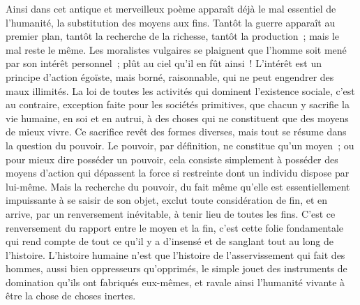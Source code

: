 \documentclass[french,twoside]{book} %
\begin{document}
Ainsi dans cet antique et merveilleux poème apparaît déjà le mal essentiel de l'humanité, la substitution des moyens aux fins. Tantôt la guerre apparaît au premier plan, tantôt la recherche de la richesse, tantôt la production ; mais le mal reste le même. Les moralistes vulgaires se plaignent que l'homme soit mené par son intérêt personnel ; plût au ciel qu'il en fût ainsi ! L'intérêt est un principe d'action égoïste, mais borné, raisonnable, qui ne peut engendrer des maux illimités. La loi de toutes les activités qui dominent l'existence sociale, c'est au contraire, exception faite pour les sociétés primitives, que chacun y sacrifie la vie humaine, en soi et en autrui, à des choses qui ne constituent que des moyens de mieux vivre. Ce sacrifice revêt des formes diverses, mais tout se résume dans la question du pouvoir. Le pouvoir, par définition, ne constitue qu'un moyen ; ou pour mieux dire posséder un pouvoir, cela consiste simplement à posséder des moyens d'action qui dépassent la force si restreinte dont un individu dispose par lui-même. Mais la recherche du pouvoir, du fait même qu'elle est essentiellement impuissante à se saisir de son objet, exclut toute considération de fin, et en arrive, par un renversement inévitable, à tenir lieu de toutes les fins. C'est ce renversement du rapport entre le moyen et la fin, c'est cette folie fondamentale qui rend compte de tout ce qu'il y a d'insensé et de sanglant tout au long de l'histoire. L'histoire humaine n'est que l'histoire de l'asservissement qui fait des hommes, aussi bien oppresseurs qu'opprimés, le simple jouet des instruments de domination qu'ils ont fabriqués eux-mêmes, et ravale ainsi l'humanité vivante à être la chose de choses inertes.\par
\end{document}
